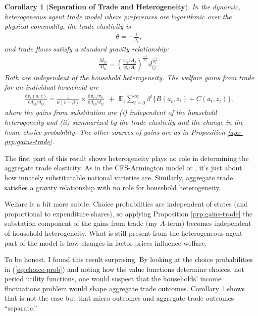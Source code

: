 \documentclass[12pt,pdftex]{article}
\newtheorem{corr}{Corollary}
\begin{document}
\begin{onehalfspacing}
\begin{corr}[\textbf{Separation of Trade and Heterogeneity}]\label{prp:seperation} In the dynamic, heterogeneous agent trade model where preferences are logarithmic over the physical commodity, the trade elasticity is
\begin{align}
\theta = -\frac{1}{\sigma_{\epsilon}}, \nonumber
\end{align}
and trade flows satisfy a standard gravity relationship:
\begin{align}
\frac{M_{ij}}{M_{ii}} = \left( \frac{  w_{j} / A_{j} }{  w_{i} / A_{i} } \right)^{\frac{-1}{\sigma_{\epsilon}}} d_{ij}^{\frac{-1}{\sigma_{\epsilon}}}. \nonumber
\end{align}
Both are independent of the household heterogeneity. The welfare gains from trade for an individual household are
\begin{align}
\nonumber
\frac{\mathrm{d} v_i(a, z)}{\mathrm{d} d_{ij} / d_{ij}} = \frac{1}{\theta (1-\beta)} \times \frac{\mathrm{d} \pi_{ii} / \pi_{ii}}{\mathrm{d}d_{ij} / d_{ij}} \ \ + \ \
\mathbb{E}_{z} \sum_{t = 0}^{\infty} \beta^{t} \bigg \{ B(a_{t},z_{t}) + C(a_{t},z_{t}) \bigg \},
\end{align}
where the gains from substitution are (i) independent of the household heterogeneity and (ii) summarized by the trade elasticity and the change in the home choice probability. The other sources of gains are as in Proposition \ref{apx-prp:gains-trade}.
\end{corr}
The first part of this result shows heterogeneity plays no role in determining the aggregate trade elasticity. As in the CES-Armington model or \citet{eaton2002technology}, it's just about how innately substitutable national varieties are. Similarly, aggregate trade satisfies a gravity relationship with no role for household heterogeneity.

Welfare is a bit more subtle. Choice probabilities are independent of states (and proportional to expenditure shares), so applying Proposition \ref{prp:gains-trade} the substation component of the gains from trade (my $A$-term) becomes independent of household heterogeneity. What is still present from the heterogeneous agent part of the model is how changes in factor prices influence welfare.

To be honest, I found this result surprising. By looking at the choice probabilities in (\ref{eq:choice-prob}) and noting how the value functions determine choices, not period utility functions, one would suspect that the households' income fluctuations problem would shape aggregate trade outcomes. Corollary \ref{prp:seperation} shows that is not the case but that micro-outcomes and aggregate trade outcomes ``separate.''


\end{onehalfspacing}
\end{document}

